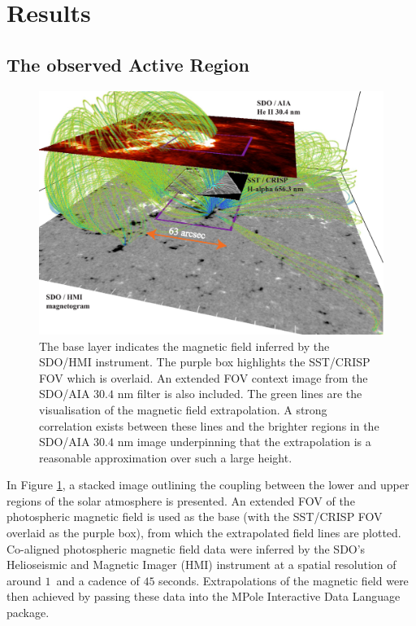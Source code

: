 \section{Results}
\label{sect2}

\subsection{The observed Active Region}

	\begin{figure}
		\centering
		\includegraphics[width=\textwidth]{full_overview.pdf}
		\caption
		{
		The base layer indicates the magnetic field inferred by the SDO/HMI instrument.
		The purple box highlights the SST/CRISP FOV which is overlaid.
		An extended FOV context image from the SDO/AIA $30.4$ nm filter is also included.
		The green lines are the visualisation of the magnetic field extrapolation.
		A strong correlation exists between these lines and the brighter regions in the SDO/AIA $30.4$ nm image underpinning that the extrapolation is a reasonable approximation over such a large height.
		}
		\label{mag_field}
	\end{figure}

	In Figure \ref{mag_field}, a stacked image outlining the coupling between the lower and upper regions of the solar atmosphere is presented.
	An extended FOV of the photospheric magnetic field is used as the base (with the SST/CRISP FOV overlaid as the purple box), from which the extrapolated field lines are plotted.
	Co-aligned photospheric magnetic field data were inferred by the SDO's Helioseismic and Magnetic Imager (HMI) instrument at a spatial resolution of around $1$\arcsecs\ and a cadence of $45$ seconds.
	Extrapolations of the magnetic field were then achieved by passing these data into the MPole Interactive Data Language package\citep{Longcope1996,Longcope2002}.

